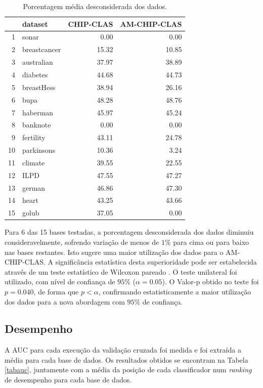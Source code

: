 \documentclass[
	12pt,				%
	openright,			%
	twoside,			%
	a4paper,			%
	english,			%
	spanish,			%
	brazil,				%
	]{abntex2}\usepackage[]{graphicx}\usepackage[]{color}
\begin{document}
\begin{table}[ht]
\centering
\caption{Porcentagem média desconsiderada dos dados.} 
\label{dltab}
\begin{tabular}{rlrr}
  \hline
 & dataset & CHIP-CLAS & AM-CHIP-CLAS \\ 
  \hline
1 & sonar & 0.00 & 0.00 \\ 
  2 & breastcancer & 15.32 & 10.85 \\ 
  3 & australian & 37.97 & 38.89 \\ 
  4 & diabetes & 44.68 & 44.73 \\ 
  5 & breastHess & 38.94 & 26.16 \\ 
  6 & bupa & 48.28 & 48.76 \\ 
  7 & haberman & 45.97 & 45.24 \\ 
  8 & banknote & 0.00 & 0.00 \\ 
  9 & fertility & 43.11 & 24.78 \\ 
  10 & parkinsons & 10.36 & 3.24 \\ 
  11 & climate & 39.55 & 22.55 \\ 
  12 & ILPD & 47.55 & 47.27 \\ 
  13 & german & 46.86 & 47.30 \\ 
  14 & heart & 43.25 & 43.66 \\ 
  15 & golub & 37.05 & 0.00 \\ 
   \hline
\end{tabular}
\end{table}
\par Para 6 das 15 bases testadas, a porcentagem desconsiderada dos dados diminuiu consideravelmente, sofrendo variação de menos de $1\%$ para cima ou para baixo nas bases restantes. Isto sugere uma maior utilização dos dados para o AM-CHIP-CLAS. A significância estatística desta superioridade pode ser estabelecida através de um teste estatístico de Wilcoxon pareado \cite{Demsar2006}. O teste unilateral foi utilizado, com nível de confiança de $95\%$ ($\alpha = 0.05$). O Valor-p obtido no teste foi $p = 0.040$, de forma que $p < \alpha$, confirmando estatisticamente a maior utilização dos dados para a nova abordagem com $95\%$ de confiança.

\subsection{Desempenho}

A AUC para cada execução da validação cruzada foi medida e foi extraída a média para cada base de dados. Os resultados obtidos se encontram na Tabela \ref{tabauc}, juntamente com a média da posição de cada classificador num \textit{ranking} de desempenho para cada base de dados.
\end{document}
